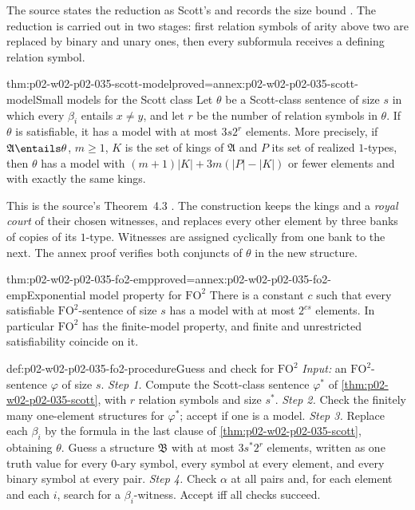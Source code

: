 The source states the reduction as Scott's and records the size bound
\cite[prop.~3.1 and pp.~4--6]{GradelKolaitisVardi1997}.  The reduction is
carried out in two stages: first relation symbols of arity above two are
replaced by binary and unary ones, then every subformula receives a defining
relation symbol.

\begin{hbtheorem}{thm:p02-w02-p02-035-scott-model}{proved=annex:p02-w02-p02-035-scott-model}{Small models for the Scott class}
Let \(\theta\) be a Scott-class sentence of size \(s\) in which every
\(\beta_i\) entails \(x\neq y\), and let \(r\) be the number of relation
symbols in \(\theta\).  If \(\theta\) is satisfiable, it has a model with at
most \(3s2^r\) elements.  More precisely, if \(\mathfrak A\entails\theta\),
\(m\geq1\), \(K\) is the set of kings of \(\mathfrak A\) and \(P\) its set of
realized \(1\)-types, then \(\theta\) has a model with
\((m+1)\lvert K\rvert+3m(\lvert P\rvert-\lvert K\rvert)\) or fewer elements and
with exactly the same kings.
\end{hbtheorem}

This is the source's Theorem~4.3 \cite[thm.~4.3]{GradelKolaitisVardi1997}.
The construction keeps the kings and a \emph{royal court} of their chosen
witnesses, and replaces every other element by three banks of copies of its
\(1\)-type.  Witnesses are assigned cyclically from one bank to the next.  The
annex proof verifies both conjuncts of \(\theta\) in the new structure.

\begin{hbcorollary}{thm:p02-w02-p02-035-fo2-emp}{proved=annex:p02-w02-p02-035-fo2-emp}{Exponential model property for \(\mathrm{FO}^2\)}
There is a constant \(c\) such that every satisfiable \(\mathrm{FO}^2\)-sentence
of size \(s\) has a model with at most \(2^{cs}\) elements.  In particular
\(\mathrm{FO}^2\) has the finite-model property, and finite and unrestricted
satisfiability coincide on it.
\end{hbcorollary}

\begin{hbmethod}{def:p02-w02-p02-035-fo2-procedure}{Guess and check for \(\mathrm{FO}^2\)}
\emph{Input:} an \(\mathrm{FO}^2\)-sentence \(\varphi\) of size \(s\).
\emph{Step 1.} Compute the Scott-class sentence \(\varphi^{*}\) of
\cref{thm:p02-w02-p02-035-scott}, with \(r\) relation symbols and size
\(s^{*}\).
\emph{Step 2.} Check the finitely many one-element structures for
\(\varphi^{*}\); accept if one is a model.
\emph{Step 3.} Replace each \(\beta_i\) by the formula in the last clause of
\cref{thm:p02-w02-p02-035-scott}, obtaining \(\theta\).  Guess a structure
\(\mathfrak B\) with at most \(3s^{*}2^r\) elements, written as one truth value
for every \(0\)-ary symbol, every symbol at every element, and every binary
symbol at every pair.
\emph{Step 4.} Check \(\alpha\) at all pairs and, for each element and each
\(i\), search for a \(\beta_i\)-witness.  Accept iff all checks succeed.
\end{hbmethod}

